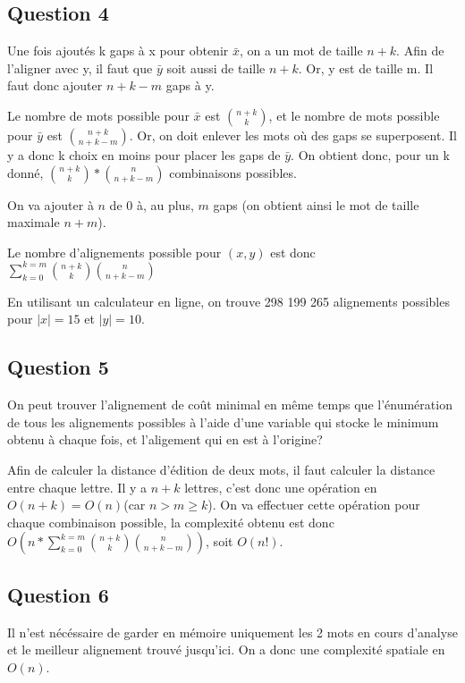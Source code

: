 \documentclass{report}
\begin{document}
\subsection*{Question 4}
Une fois ajoutés k gaps à x pour obtenir $\bar{x}$, on a un mot de taille $n+k$. Afin de l'aligner avec y, il faut que $\bar{y}$ soit aussi de taille $n+k$. Or, y est de taille m. Il faut donc ajouter $n+k-m$ gaps à y.

Le nombre de mots possible pour $\bar{x}$ est $\binom{n+k}{k}$, et le nombre de mots possible pour $\bar{y}$ est  $\binom{n+k}{n+k-m}$. Or, on doit enlever les mots où des gaps se superposent. Il y a donc k choix en moins pour placer les gaps de $\bar{y}$. On obtient donc, pour un k donné, $\binom{n+k}{k}*\binom{n}{n+k-m}$ combinaisons possibles.

On va ajouter à $n$ de 0 à, au plus, $m$ gaps (on obtient ainsi le mot de taille maximale $n+m$).

Le nombre d'alignements possible pour $(x,y)$ est donc $ \sum_{k=0}^{k=m}\binom{n+k}{k}\binom{n}{n+k-m}$

En utilisant un calculateur en ligne, on trouve 298 199 265 alignements possibles pour $|x|=15$ et $|y|=10$.

\subsection*{Question 5}
On peut trouver l'alignement de coût minimal en même temps que l'énumération de tous les alignements possibles à l'aide d'une variable qui stocke le minimum obtenu à chaque fois, et l'aligement qui en est à l'origine?

Afin de calculer la distance d'édition de deux mots, il faut calculer la distance entre chaque lettre. Il y a $n+k$ lettres, c'est donc une opération en $O(n+k)=O(n)$(car $n>m\ge k$). On va effectuer cette opération pour chaque combinaison possible, la complexité obtenu est donc $O(n*\sum_{k=0}^{k=m}\binom{n+k}{k}\binom{n}{n+k-m})$, soit $O(n!)$.


\subsection*{Question 6}
Il n'est nécéssaire de garder en mémoire uniquement les 2 mots en cours d'analyse et le meilleur alignement trouvé jusqu'ici. On a donc une complexité spatiale en $O(n)$.
 
\end{document}
